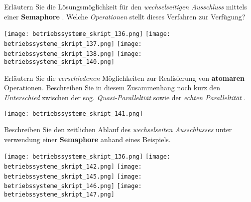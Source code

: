 \documentclass{article}
\begin{document}
\begin{tcolorbox}[colback=white!10!white,colframe=lightgray!75!black,
  savelowerto=\jobname_ex.tex]

\begin{center}
Erläutern Sie die Lösungsmöglichkeit für den 
\textit{wechselseitigen Ausschluss
} mittels einer 
\textbf{Semaphore
}. Welche 
\textit{Operationen
} stellt dieses Verfahren zur Verfügung?

\end{center}

\tcblower

\justifying
\texttt{[image: betriebssysteme\_skript\_136.png]}
\texttt{[image: betriebssysteme\_skript\_137.png]}
\texttt{[image: betriebssysteme\_skript\_138.png]}
\texttt{[image: betriebssysteme\_skript\_140.png]}

\end{tcolorbox}
\begin{tcolorbox}[colback=white!10!white,colframe=lightgray!75!black,
  savelowerto=\jobname_ex.tex]

\begin{center}
Erläutern Sie die 
\textit{verschiedenen
} Möglichkeiten zur Realisierung von 
\textbf{atomaren
} Operationen.
Beschreiben Sie in diesem Zusammenhang noch kurz den 
\textit{Unterschied
} zwischen der sog. 
\textit{Quasi-Paralleltiät
} sowie der 
\textit{echten Paralleltität
}.

\end{center}

\tcblower

\justifying
\texttt{[image: betriebssysteme\_skript\_141.png]}

\end{tcolorbox}
\begin{tcolorbox}[colback=white!10!white,colframe=lightgray!75!black,
  savelowerto=\jobname_ex.tex]

\begin{center}
Beschreiben Sie den zeitlichen Ablauf des 
\textit{wechselseiten Ausschlusses
} unter verwendung einer 
\textbf{Semaphore
} anhand eines Beispiels.

\end{center}

\tcblower

\justifying
\texttt{[image: betriebssysteme\_skript\_136.png]}
\texttt{[image: betriebssysteme\_skript\_142.png]}
\texttt{[image: betriebssysteme\_skript\_145.png]}
\texttt{[image: betriebssysteme\_skript\_146.png]}
\texttt{[image: betriebssysteme\_skript\_147.png]}

\end{tcolorbox}
\end{document}
